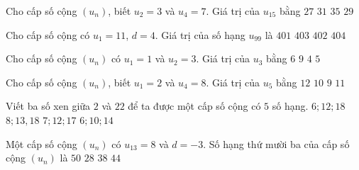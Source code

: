 \begin{ex}%
	Cho cấp số  cộng $(u_n)$, biết $u_2=3$ và $u_4=7$. Giá trị của $u_{15}$ bằng
	\choice 
		 {$27$}
		{$31$} 
		 {$35$}
		{\True $29$} 
\end{ex}

\begin{ex}%
	Cho cấp số cộng  có $u_1=11$, $d=4$. Giá trị của số hạng $u_{99}$ là
	 \choice
		 {$401$}
		{\True  $403$}
		 {$402$}
		{$404$} 
\end{ex}

\begin{ex}%
	Cho cấp số cộng  $(u_n)$ có $u_1=1$ và $u_2=3$. Giá trị của $u_3$ bằng
	\choice 
		 {$6$}
		{$9$} 
		 {$4$}
		 {\True$5$}
\end{ex}

\begin{ex}%
	Cho cấp số cộng $(u_n)$, biết $u_1=2$ và $u_4=8$. Giá trị của  $u_5$ bằng
	\choice 
		{$12$} 
		 {\True $10$}
		 {$9$}
		 {$11$}
\end{ex}

\begin{ex}%
	Viết ba số xen giữa $2$ và $22$ để ta được một cấp số cộng có $5$ số hạng. 
	\choice 
		{$6; 12;  18$}
		{$8;  13, 18$}
		{\True $7; 12;  17$}
		 {$6; 10; 14$}
\end{ex}

\begin{ex}%
	Một cấp số cộng $(u_n)$ có $u_{13}=8$ và $d=-3$. Số hạng thứ mười ba của cấp  số cộng $(u_n)$ là
	 \choice
		 {$50$}
		 {$28$}
		{\True  $38$}
		{$44$} 
\end{ex}

